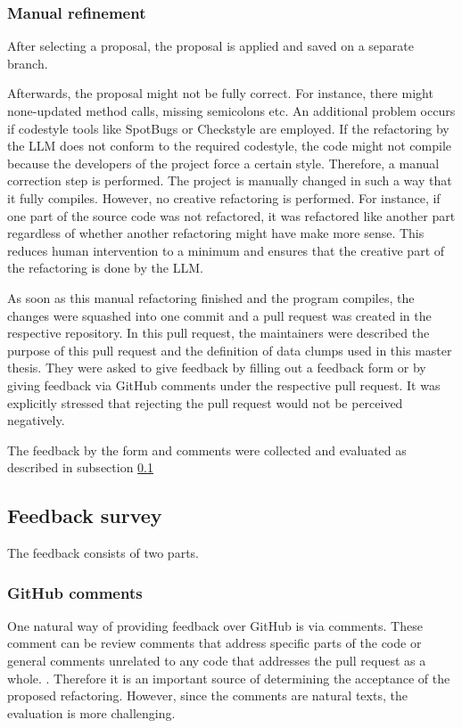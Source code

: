 \subsubsection{Manual refinement}\label{sec:manual_refinement}
After selecting a proposal, the proposal is applied and saved on a separate branch.

Afterwards, the proposal might not be fully correct. For instance, there might none-updated method calls, missing semicolons etc. An additional problem occurs if codestyle tools like SpotBugs or Checkstyle are employed. If the refactoring by the \ac{LLM} does not conform to the required codestyle, the code might not compile because the developers of the project force a certain style. Therefore, a manual correction step is performed. The project is  manually changed in such a way that it fully compiles. However, no creative refactoring is performed. For instance, if one part of the source code was not refactored, it was refactored like another part regardless of whether another refactoring might have make more sense. This reduces human intervention to a minimum and ensures that the creative part of the refactoring is done by the \ac{LLM}. 

As soon as this manual refactoring finished and the program compiles, the changes were squashed into one commit and a pull request was created in the respective repository. In this pull request, the maintainers were described the purpose of this pull request and  the definition of data clumps used in this master thesis. They were asked to give feedback by filling out a feedback form or by giving feedback via GitHub comments under the respective pull request. It was explicitly stressed that rejecting the pull request would not be perceived negatively. 

The feedback by the form and comments were collected and evaluated as described in subsection \ref{sec:feedback_survey}

\subsection{Feedback survey}\label{sec:feedback_survey}

The feedback consists of two parts.
\subsubsection{GitHub comments}
One  natural way of providing feedback over GitHub is via comments. These comment can be review comments that address specific parts of the code or general comments unrelated to any code that addresses the pull request as a whole. \cite{10.1145/3597208}. Therefore it is an important source of determining the acceptance of the proposed refactoring. However, since the comments are natural texts, the evaluation is more challenging.


